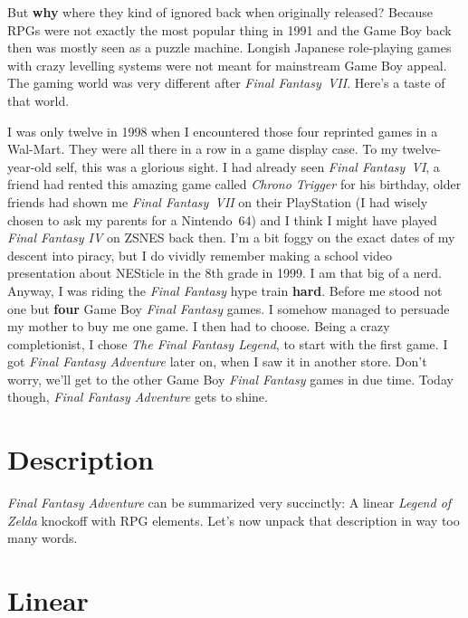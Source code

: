 \documentclass{book}
\begin{document}
But \textbf{why} where they kind of ignored back when originally released? Because RPGs were not exactly the most popular thing in 1991 and the Game Boy back then was mostly seen as a puzzle machine. Longish Japanese role-playing games with crazy levelling systems were not meant for mainstream Game Boy appeal. The gaming world was very different after \emph{Final Fantasy~VII}. Here’s a taste of that world.

I was only twelve in 1998 when I encountered those four reprinted games in a Wal-Mart. They were all there in a row in a game display case. To my twelve-year-old self, this was a glorious sight. I had already seen \emph{Final Fantasy~VI}, a friend had rented this amazing game called \emph{Chrono Trigger} for his birthday, older friends had shown me \emph{Final Fantasy~VII} on their PlayStation (I had wisely chosen to ask my parents for a Nintendo~64) and I think I might have played \emph{Final Fantasy IV} on ZSNES back then. I’m a bit foggy on the exact dates of my descent into piracy, but I do vividly remember making a school video presentation about NESticle in the 8th grade in 1999. I am that big of a nerd. Anyway, I was riding the \emph{Final Fantasy} hype train \textbf{hard}. Before me stood not one but \textbf{four} Game Boy \emph{Final Fantasy} games. I somehow managed to persuade my mother to buy me one game. I then had to choose. Being a crazy completionist, I chose \emph{The Final Fantasy Legend}, to start with the first game. I got \emph{Final Fantasy Adventure} later on, when I saw it in another store. Don’t worry, we’ll get to the other Game Boy \emph{Final Fantasy} games in due time. Today though, \emph{Final Fantasy Adventure} gets to shine.

\FloatBarrier\needspace{10mm}\section*{Description}\nopagebreak[4]

\emph{Final Fantasy Adventure} can be summarized very succinctly: A linear \emph{Legend of Zelda} knockoff with RPG elements. Let’s now unpack that description in way too many words.

\FloatBarrier\needspace{10mm}\section*{Linear}\nopagebreak[4]
\end{document}
